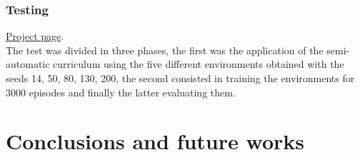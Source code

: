 \documentclass[11pt, a4paper, hidelinks]{report}
\begin{document}
\subsection{Testing}\label{subsec:testing3}
\href{https://app.wandb.ai/lomb/flatland-challenge-ps-ppo-curriculum?workspace=user-lomb}{Project page}.\\

The test was divided in three phases, the first was the application of the semi-automatic curriculum using the five different environments obtained with the seeds 14, 50, 80, 130, 200, the second consisted in training the environments for 3000 episodes and finally the latter evaluating them.

\chapter{Conclusions and future works}\label{ch:conclusions-and-future-works}
\end{document}
